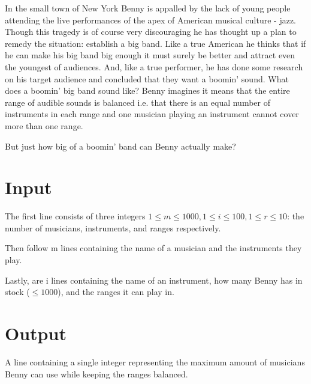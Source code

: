 
In the small town of New York Benny is appalled by the lack of young people attending the live performances of the apex of American musical culture - jazz. Though this tragedy is of course very discouraging he has thought up a plan to remedy the situation: establish a big band. Like a true American he thinks that if he can make his big band big enough it must surely be better and attract even the youngest of audiences. And, like a true performer, he has done some research on his target audience and concluded that they want a boomin' sound. What does a boomin' big band sound like? Benny imagines it means that the entire range of audible sounds is balanced i.e. that there is an equal number of instruments in each range and one musician playing an instrument cannot cover more than one range.

But just how big of a boomin' band can Benny actually make?

\section*{Input}

The first line consists of three integers $1 \le m \le 1000, 1 \le i \le 100, 1 \le r \le 10$: the number of musicians, instruments, and ranges respectively.

Then follow m lines containing the name of a musician and the instruments they play.

Lastly, are i lines containing the name of an instrument, how many Benny has in stock ($ \le 1000$), and the ranges it can play in. 

\section*{Output}

A line containing a single integer representing the maximum amount of musicians Benny can use while keeping the ranges balanced.
